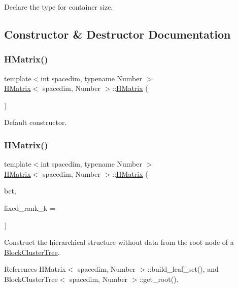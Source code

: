 Declare the type for container size. 

\subsection{Constructor \& Destructor Documentation}
\mbox{\label{classHMatrix_ae3dc35e1aefee2580d27ad2d65c906de}} 
\subsubsection{\texorpdfstring{H\+Matrix()}{HMatrix()}\hspace{0.1cm}{\footnotesize\ttfamily [1/9]}}
{\footnotesize\ttfamily template$<$int spacedim, typename Number $>$ \\
\hyperlink{classHMatrix}{H\+Matrix}$<$ spacedim, Number $>$\+::\hyperlink{classHMatrix}{H\+Matrix} (\begin{DoxyParamCaption}{ }\end{DoxyParamCaption})}

Default constructor. \mbox{\label{classHMatrix_a6a4dead0321e8df38865bf6fbd0f6e81}} 
\subsubsection{\texorpdfstring{H\+Matrix()}{HMatrix()}\hspace{0.1cm}{\footnotesize\ttfamily [2/9]}}
{\footnotesize\ttfamily template$<$int spacedim, typename Number $>$ \\
\hyperlink{classHMatrix}{H\+Matrix}$<$ spacedim, Number $>$\+::\hyperlink{classHMatrix}{H\+Matrix} (\begin{DoxyParamCaption}\item[{const \hyperlink{classBlockClusterTree}{Block\+Cluster\+Tree}$<$ spacedim, Number $>$ \&}]{bct,  }\item[{const unsigned int}]{fixed\+\_\+rank\+\_\+k = {} }\end{DoxyParamCaption})}

Construct the hierarchical structure without data from the root node of a \hyperlink{classBlockClusterTree}{Block\+Cluster\+Tree}. 

References H\+Matrix$<$ spacedim, Number $>$\+::build\+\_\+leaf\+\_\+set(), and Block\+Cluster\+Tree$<$ spacedim, Number $>$\+::get\+\_\+root().


